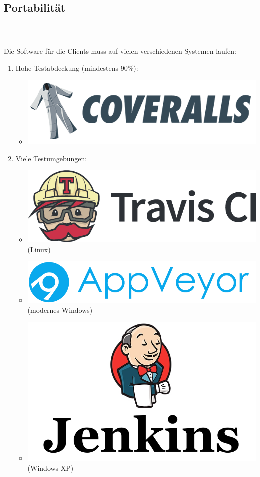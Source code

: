 \documentclass[accentcolor=tud1b,colorbacktitle,landscape,german,presentation]{tudbeamer}
\newcommand{\ftitle}{
	\frametitle{\insertsectionhead \\ {\small \insertsubsectionhead}}
}
\begin{document}
\subsection{Portabilität}
\begin{frame}
	\ftitle
	Die Software für die Clients muss auf vielen verschiedenen Systemen laufen:\\[5pt]
	\begin{enumerate}
		\item Hohe Testabdeckung (mindestens 90\%):
		\begin{itemize}
			\item \includegraphics[scale=0.1]{coveralls}
		\end{itemize}
		\item Viele Testumgebungen:
		\begin{itemize}
			\item \includegraphics[scale=0.1]{travisci} \hspace*{2cm} (Linux)
			\item \includegraphics[scale=0.1]{appveyor} \hspace*{1.55cm} (modernes Windows)
			\item \includegraphics[scale=0.1]{jenkins} \hspace*{2.5cm} (Windows XP)
		\end{itemize}
	\end{enumerate}


\end{frame}
\end{document}
